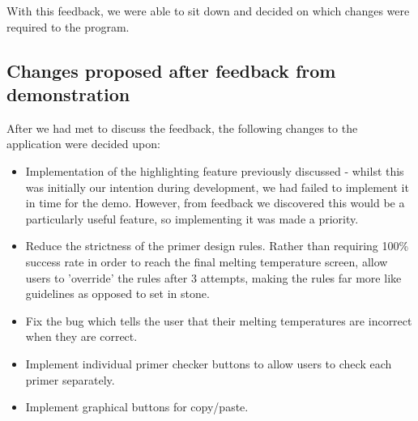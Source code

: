 With this feedback, we were able to sit down and decided on which changes were required to the program.

\subsection{Changes proposed after feedback from demonstration} 

After we had met to discuss the feedback, the following changes to the application were decided upon:

\begin{itemize}

\item Implementation of the highlighting feature previously discussed - whilst this was initially our intention during development, we had failed to implement it in time for the demo. However, from feedback we discovered this would be a particularly useful feature, so implementing it was made a priority.
\item Reduce the strictness of the primer design rules. Rather than requiring 100\% success rate in order to reach the final melting temperature screen, allow users to 'override' the rules after 3 attempts, making the rules far more like guidelines as opposed to set in stone.
\item Fix the bug which tells the user that their melting temperatures are incorrect when they are correct.
\item Implement individual primer checker buttons to allow users to check each primer separately.
\item Implement graphical buttons for copy/paste.

\end{itemize}
